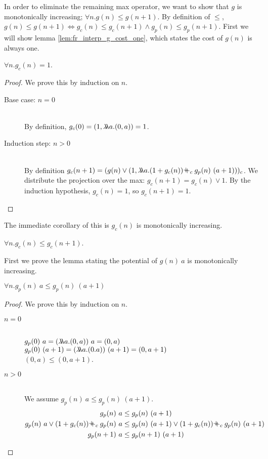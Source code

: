 %
In order to eliminate the remaining max operator, we want to show that $g$ is
monotonically increasing; $\forall n.g(n) \leq g(n+1)$.
By definition of $\leq$,
$g(n) \leq g(n+1) \Leftrightarrow g_c(n) \leq g_c(n+1) \land g_p(n) \leq g_p(n+1)$.
First we will show lemma \ref{lem:fr_interp_g_cost_one}, which states the cost
of $g(n)$ is always one.
%
\begin{lemma}
  \label{lem:fr_interp_g_cost_one}
  $\forall n. g_c(n) = 1$.
\end{lemma}
%
\begin{proof}
We prove this by induction on $n$.
  \begin{description}
    \item[Base case: $n=0$]\hfill \\
      By definition, $g_c(0) = (1, \lambda\!\!\lambda a.(0,a)) = 1$.
    \item[Induction step: $n>0$]\hfill \\
      By definition $g_c(n+1) = (g(n) \vee (1, \llambda a. (1 + g_c(n)) \pplus_c g_p(n)\ (a+1)))_c$.
      We distribute the projection over the max: $g_c(n+1) = g_c(n) \vee 1$.
      By the induction hypothesis, $g_c(n) = 1$, so $g_c(n+1) = 1$.
  \end{description}
\end{proof}
%
The immediate corollary of this is $g_c(n)$ is monotonically increasing.
%
\begin{corollary}
  \label{lem:fr_interp_g_cost_monotonically_increasing}
  $\forall n. g_c(n) \leq g_c(n+1)$.
\end{corollary}
%
First we prove the lemma stating the potential of $g(n)\ a$ is monotonically
increasing.
%
\begin{lemma}
  \label{lem:fr_interp_g_potential_monotonically_increasing}
  $\forall n.g_p(n)\ a \leq g_p(n)\ (a+1)$
\end{lemma}
%
\begin{proof}
  We prove this by induction on $n$.
  \begin{description}
    \item[$n=0$]\hfill \\
      $g_p(0)\ a = (\lambda\!\!\lambda a.(0,a))\ a = (0,a)$\\
      $g_p(0)\ (a+1) = (\lambda\!\!\lambda a.(0.a))\ (a+1) = (0,a+1)$\\
      $(0,a) \leq (0,a+1)$.
    \item[$n>0$]\hfill \\
      We assume $g_p(n)\ a \leq g_p(n)\ (a+1)$.
      \begin{align*}
      g_p(n)\ a &\leq g_p(n)\ (a+1)  \\
      g_p(n)\ a \vee (1 + g_c(n)) \pplus_c g_p(n)\ a &\leq g_p(n)\ (a+1) \vee (1 + g_c(n)) \pplus_c g_p(n)\ (a+1) \\
      g_p(n+1)\ a &\leq g_p(n+1)\ (a+1)
      \end{align*}
  \end{description}
\end{proof}
